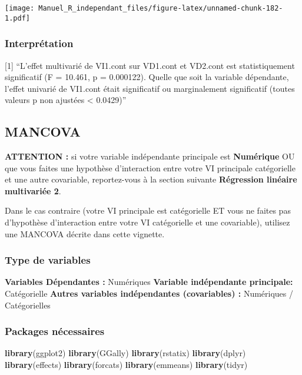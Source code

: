 \documentclass[
]{book}
\newenvironment{Shaded}{\begin{snugshade}}{\end{snugshade}}
\newcommand{\KeywordTok}[1]{\textcolor[rgb]{0.13,0.29,0.53}{\textbf{#1}}}
\newcommand{\NormalTok}[1]{#1}
\begin{document}
\texttt{[image: Manuel\_R\_independant\_files/figure-latex/unnamed-chunk-182-1.pdf]}

\hypertarget{interpruxe9tation-1}{%
\subsubsection{Interprétation}\label{interpruxe9tation-1}}

{[}1{]} ``L'effet multivarié de VI1.cont sur VD1.cont et VD2.cont est statistiquement significatif (F = 10.461, p = 0.000122). Quelle que soit la variable dépendante, l'effet univarié de VI1.cont était significatif ou marginalement significatif (toutes valeurs p non ajustées \textless{} 0.0429)''

\hypertarget{mancova}{%
\subsection{MANCOVA}\label{mancova}}

\textbf{ATTENTION :} si votre variable indépendante principale est \textbf{Numérique} OU que vous faites une hypothèse d'interaction entre votre VI principale catégorielle et une autre covariable, reportez-vous à la section suivante \textbf{Régression linéaire multivariée 2}.

Dans le cas contraire (votre VI principale est catégorielle ET vous ne faites pas d'hypothèse d'interaction entre votre VI catégorielle et une covariable), utilisez une MANCOVA décrite dans cette vignette.

\hypertarget{type-de-variables-22}{%
\subsubsection{Type de variables}\label{type-de-variables-22}}

\textbf{Variables Dépendantes :} Numériques
\textbf{Variable indépendante principale:} Catégorielle
\textbf{Autres variables indépendantes (covariables) :} Numériques / Catégorielles

\hypertarget{packages-nuxe9cessaires-22}{%
\subsubsection{Packages nécessaires}\label{packages-nuxe9cessaires-22}}

\begin{Shaded}
\begin{Highlighting}[]
\KeywordTok{library}\NormalTok{(ggplot2)}
\KeywordTok{library}\NormalTok{(GGally)}
\KeywordTok{library}\NormalTok{(rstatix)}
\KeywordTok{library}\NormalTok{(dplyr)}
\KeywordTok{library}\NormalTok{(effects)}
\KeywordTok{library}\NormalTok{(forcats)}
\KeywordTok{library}\NormalTok{(emmeans)}
\KeywordTok{library}\NormalTok{(tidyr)}
\end{Highlighting}
\end{Shaded}
\end{document}
